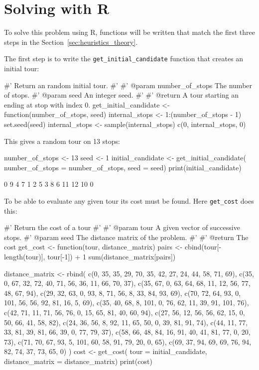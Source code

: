 \section{Solving with R}\label{sec:heuristics_solving-with-R}

To solve this problem using R, functions will be written that match the
first three steps in the Section~\ref{sec:heuristics_theory}.

The first step is to write the \texttt{get_initial_candidate}
function that creates an initial tour:

\begin{Rin}
#' Return an random initial tour.
#'
#' @param number_of_stops The number of stops.
#' @param seed An integer seed.
#'
#' @return A tour starting an ending at stop with index 0.
get_initial_candidate <- function(number_of_stops, seed){
  internal_stops <- 1:(number_of_stops - 1)
  set.seed(seed)
  internal_stops <- sample(internal_stops)
  c(0, internal_stops, 0)
}
\end{Rin}

This gives a random tour on 13 stops:

\begin{Rin}
number_of_stops <- 13
seed <- 1
initial_candidate <- get_initial_candidate(
  number_of_stops = number_of_stops,
  seed = seed)
print(initial_candidate)
\end{Rin}

\begin{Rout}
 [1]  0  9  4  7  1  2  5  3  8  6 11 12 10  0
\end{Rout}

To be able to evaluate any given tour its cost must be found. Here
\texttt{get_cost}  does this:

\begin{Rin}
#' Return the cost of a tour
#'
#' @param tour A given vector of successive stops.
#' @param seed The distance matrix of the problem.
#'
#' @return The cost
get_cost <- function(tour, distance_matrix){
  pairs <-  cbind(tour[-length(tour)], tour[-1]) + 1
  sum(distance_matrix[pairs])
}
\end{Rin}

\begin{Rin}
distance_matrix <- rbind(
        c(0, 35, 35, 29, 70, 35, 42, 27, 24, 44, 58, 71, 69),
        c(35, 0, 67, 32, 72, 40, 71, 56, 36, 11, 66, 70, 37),
        c(35, 67, 0, 63, 64, 68, 11, 12, 56, 77, 48, 67, 94),
        c(29, 32, 63, 0, 93, 8, 71, 56, 8, 33, 84, 93, 69),
        c(70, 72, 64, 93, 0, 101, 56, 56, 92, 81, 16, 5, 69),
        c(35, 40, 68, 8, 101, 0, 76, 62, 11, 39, 91, 101, 76),
        c(42, 71, 11, 71, 56, 76, 0, 15, 65, 81, 40, 60, 94),
        c(27, 56, 12, 56, 56, 62, 15, 0, 50, 66, 41, 58, 82),
        c(24, 36, 56, 8, 92, 11, 65, 50, 0, 39, 81, 91, 74),
        c(44, 11, 77, 33, 81, 39, 81, 66, 39, 0, 77, 79, 37),
        c(58, 66, 48, 84, 16, 91, 40, 41, 81, 77, 0, 20, 73),
        c(71, 70, 67, 93, 5, 101, 60, 58, 91, 79, 20, 0, 65),
        c(69, 37, 94, 69, 69, 76, 94, 82, 74, 37, 73, 65, 0)
)
cost <- get_cost(
  tour = initial_candidate,
  distance_matrix = distance_matrix)
print(cost)
\end{Rin}

